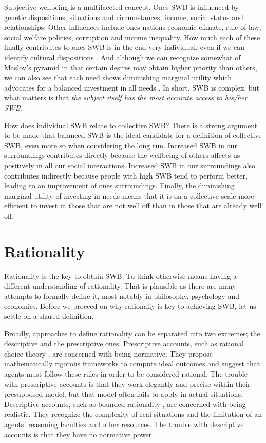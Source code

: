 Subjective wellbeing is a multifaceted concept. Ones SWB is influenced by genetic dispositions, situations and circumstances, income, social status and relationships. Other influences include ones nations economic climate, rule of law, social welfare policies, corruption and income inequality. How much each of these finally contributes to ones SWB is in the end very individual, even if we can identify cultural dispositions \cite{Tay2016}. And although we can recognize somewhat of Maslov's pyramid in that certain desires may obtain higher priority than others, we can also see that each need shows diminishing marginal utility which advocates for a balanced investment in all needs \cite{Tay2011}. In short, SWB is complex, but what matters is that {\it the subject itself has the most accurate access to his/her SWB.}

How does individual SWB relate to collective SWB? There is a strong argument to be made that balanced SWB is the ideal candidate for a definition of collective SWB, even more so when considering the long run. Increased SWB in our surroundings contributes directly because the wellbeing of others affects us positively in all our social interactions. Increased SWB in our surroundings also contributes indirectly because people with high SWB tend to perform better, leading to an improvement of ones surroundings. Finally, the diminishing marginal utility of investing in needs means that it is on a collective scale more efficient to invest in those that are not well off than in those that are already well off.

\section{Rationality}

Rationality is the key to obtain SWB. To think otherwise means having a different understanding of rationality. That is plausible as there are many attempts to formally define it, most notably in philosophy, psychology and economics. Before we proceed on why rationaliy is key to achieving SWB, let us settle on a shared definition.

Broadly, approaches to define rationality can be separated into two extremes; the descriptive and the prescriptive ones. Prescriptive accounts, such as rational choice theory \cite{Hands2015}, are concerned with being normative. They propose mathematically rigorous frameworks to compute ideal outcomes and suggest that agents must follow these rules in order to be considered rational. The trouble with prescriptive accounts is that they work elegantly and precise within their presupposed model, but that model often fails to apply in actual situations. Descriptive accounts, such as bounded rationality \cite{Simon1955}, are concerned with being realistic. They recognize the complexity of real situations and the limitation of an agents' reasoning faculties and other resources. The trouble with descriptive accounts is that they have no normative power.

